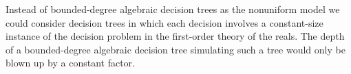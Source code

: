 
Instead of bounded-degree algebraic decision trees as the nonuniform model
we could consider decision trees in which
each decision involves a constant-size instance of the decision problem in the
first-order theory of the reals. The depth of a bounded-degree algebraic
decision tree simulating such a tree would only be blown up by a constant factor.
